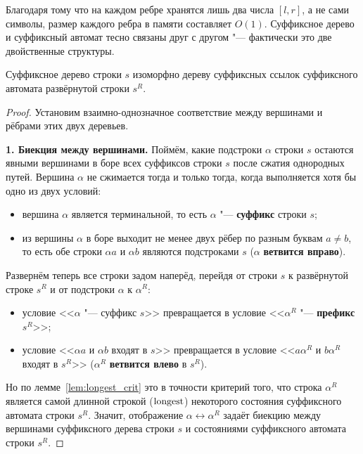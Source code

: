 Благодаря тому что на каждом ребре хранятся лишь два числа $[l, r]$, а не сами символы, размер каждого ребра в памяти составляет $O(1)$. Суффиксное дерево и суффиксный автомат тесно связаны друг с другом "--- фактически это две двойственные структуры.

\begin{theorem}\label{thm:st_sa_duality}
    Суффиксное дерево строки $s$ изоморфно дереву суффиксных ссылок суффиксного автомата развёрнутой строки $s^R$.
\end{theorem}

\begin{proof}
    Установим взаимно-однозначное соответствие между вершинами и рёбрами этих двух деревьев.

    \textbf{1. Биекция между вершинами.} Поймём, какие подстроки $\alpha$ строки $s$ остаются явными вершинами в боре всех суффиксов строки $s$ после сжатия однородных путей. Вершина $\alpha$ не сжимается тогда и только тогда, когда выполняется хотя бы одно из двух условий:
    \begin{itemize}
        \item вершина $\alpha$ является терминальной, то есть $\alpha$ "--- \textbf{суффикс} строки $s$;
        \item из вершины $\alpha$ в боре выходит не менее двух рёбер по разным буквам $a \ne b$, то есть обе строки $\alpha a$ и $\alpha b$ являются подстроками $s$ ($\alpha$ \textbf{ветвится вправо}).
    \end{itemize}
    Развернём теперь все строки задом наперёд, перейдя от строки $s$ к развёрнутой строке $s^R$ и от подстроки $\alpha$ к $\alpha^R$:
    \begin{itemize}
        \item условие <<$\alpha$ "--- суффикс $s$>> превращается в условие <<$\alpha^R$ "--- \textbf{префикс} $s^R$>>;
        \item условие <<$\alpha a$ и $\alpha b$ входят в $s$>> превращается в условие <<$a\alpha^R$ и $b\alpha^R$ входят в $s^R$>> ($\alpha^R$ \textbf{ветвится влево} в $s^R$).
    \end{itemize}
    Но по лемме~\ref{lem:longest_crit} это в точности критерий того, что строка $\alpha^R$ является самой длинной строкой ($\operatorname{longest}$) некоторого состояния суффиксного автомата строки $s^R$. Значит, отображение $\alpha \leftrightarrow \alpha^R$ задаёт биекцию между вершинами суффиксного дерева строки $s$ и состояниями суффиксного автомата строки $s^R$.


\end{proof}
